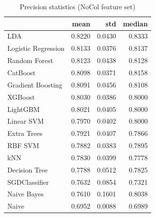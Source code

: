 \begin{table}
\caption{Precision statistics (NoCol feature set)}
\label{tab:precision_NoCol_stats}
\begin{tabular}{lrrr}
\toprule
 & mean & std & median \\
\midrule
LDA & 0.8220 & 0.0430 & 0.8333 \\
Logistic Regression & 0.8133 & 0.0376 & 0.8137 \\
Random Forest & 0.8123 & 0.0438 & 0.8128 \\
CatBoost & 0.8098 & 0.0371 & 0.8158 \\
Gradient Boosting & 0.8091 & 0.0456 & 0.8108 \\
XGBoost & 0.8030 & 0.0386 & 0.8000 \\
LightGBM & 0.8021 & 0.0405 & 0.8000 \\
Linear SVM & 0.7970 & 0.0402 & 0.8000 \\
Extra Trees & 0.7921 & 0.0407 & 0.7866 \\
RBF SVM & 0.7882 & 0.0383 & 0.7895 \\
kNN & 0.7830 & 0.0399 & 0.7778 \\
Decision Tree & 0.7788 & 0.0512 & 0.7825 \\
SGDClassifier & 0.7632 & 0.0854 & 0.7321 \\
Naive Bayes & 0.7610 & 0.1601 & 0.8038 \\
Naive & 0.6952 & 0.0088 & 0.6989 \\
\bottomrule
\end{tabular}
\end{table}
